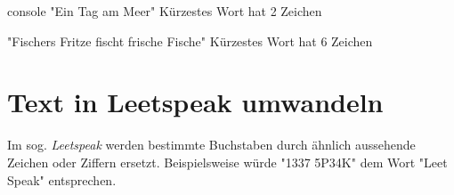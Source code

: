 \begin{mybox}[Bildschirmausgabe]{console}
"Ein Tag am Meer"
Kürzestes Wort hat 2 Zeichen

"Fischers Fritze fischt frische Fische"
Kürzestes Wort hat 6 Zeichen
\end{mybox}




\chapter{Text in Leetspeak umwandeln}

\vspace{10pt}

Im sog. \textit{Leetspeak} werden bestimmte Buchstaben durch ähnlich aussehende
Zeichen oder Ziffern ersetzt. Beispielsweise würde "\textsf{1337 5P34K}" dem
Wort "\textsf{Leet Speak}" entsprechen.

